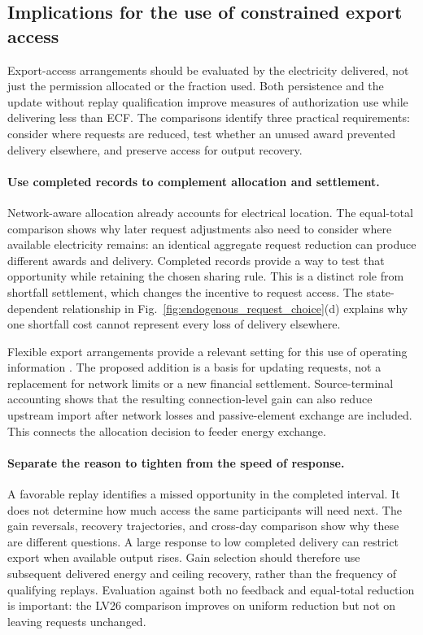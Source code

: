 \documentclass[twoside,twocolumn,9pt]{article}
\begin{document}
\subsection{Implications for the use of constrained export access}
\label{sec:discussion}
\label{sec:policy_implications}

Export-access arrangements should be evaluated by the electricity delivered,
not just the permission allocated or the fraction used. Both persistence and
the update without replay qualification improve measures of authorization use
while delivering less than ECF. The comparisons identify three practical
requirements: consider where requests are reduced, test whether an unused
award prevented delivery elsewhere, and preserve access for output recovery.

\paragraph{Use completed records to complement allocation and settlement.}
Network-aware allocation already accounts for electrical location. The
equal-total comparison shows why later request adjustments also need to
consider where available electricity remains: an identical aggregate request
reduction can produce different awards and delivery. Completed records provide
a way to test that opportunity while retaining the chosen sharing rule.
This is a distinct role from shortfall settlement, which changes the incentive
to request access. The state-dependent relationship in
Fig.~\ref{fig:endogenous_request_choice}(d) explains why one shortfall cost
cannot represent every loss of delivery elsewhere.

Flexible export arrangements provide a relevant setting for this use of
operating information
\cite{sapn2024dapr,cpuc2022e5230,eu2024flexibleconnections}.
The proposed addition is a basis for updating requests, not a replacement
for network limits or a new financial settlement. Source-terminal accounting
shows that the resulting connection-level gain can also reduce upstream
import after network losses and passive-element exchange are included.
This connects the allocation decision to feeder energy exchange.

\paragraph{Separate the reason to tighten from the speed of response.}
A favorable replay identifies a missed opportunity in the completed interval.
It does not determine how much access the same participants will need next.
The gain reversals, recovery trajectories, and cross-day comparison show why
these are different questions. A large response to low completed delivery can
restrict export when available output rises. Gain selection should therefore
use subsequent delivered energy and ceiling recovery, rather than the
frequency of qualifying replays. Evaluation against both no feedback and
equal-total reduction is important: the LV26 comparison improves on uniform
reduction but not on leaving requests unchanged.
\end{document}
